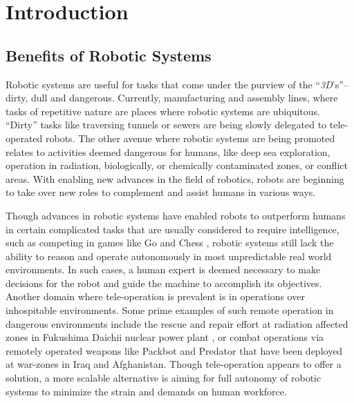 
\chapter{Introduction}
\label{chap:thesis_intro}

\section{Benefits of Robotic Systems}

Robotic systems are useful for tasks that come under the purview of the ``\emph{3D}'s''--dirty, dull and dangerous. 
Currently, manufacturing and assembly lines, where tasks of repetitive nature are places where robotic systems are ubiquitous. ``Dirty'' tasks like traversing tunnels or sewers are being slowly delegated to tele-operated robots. 
The other avenue where robotic systems are being promoted relates to activities deemed dangerous for humans, like deep sea exploration, operation in radiation, biologically, or chemically contaminated zones, or conflict areas. With enabling new advances in the field of robotics, robots are beginning to take over new roles to complement and assist humans in various ways.

Though advances in robotic systems have enabled robots to outperform humans in certain complicated tasks that are usually considered to require intelligence, such as competing in games like Go \cite{deepmind} and Chess \cite{deepblue}, 
robotic systems still lack the ability to reason and operate
autonomously in most unpredictable real world environments. 
In such cases, a human expert is deemed necessary to make decisions for the robot and guide the machine
to accomplish its objectives. Another domain where tele-operation is prevalent is in operations over inhospitable environments. Some prime examples of such remote operation in
dangerous environments include the rescue and repair effort at radiation affected zones in Fukushima Daichii nuclear power plant \cite{fukushima}, or combat operations via remotely operated weapons like Packbot \cite{packbot} and Predator \cite{predator} that have been deployed
at war-zones in Iraq and Afghanistan. Though tele-operation appears to offer a solution, a more scalable alternative
is aiming for full autonomy of robotic systems to minimize the strain and demands on human workforce.

